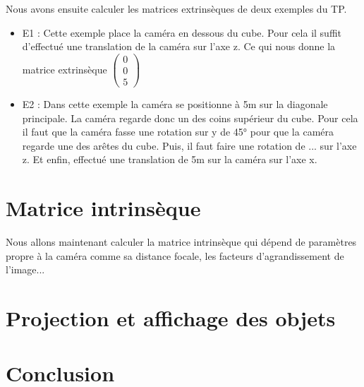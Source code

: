 \documentclass[a4paper,11pt]{article}
\begin{document}
  Nous avons ensuite calculer les matrices extrinsèques de deux exemples du TP.
  \begin{itemize}
   \item E1 : Cette exemple place la caméra en dessous du cube. Pour cela il suffit
   d'effectué une translation de la caméra sur l'axe z. Ce qui nous donne la matrice
   extrinsèque 
    $\begin{pmatrix}
      0\\
      0\\
      5
      \end{pmatrix}$
   \item E2 : Dans cette exemple la caméra se positionne à 5m sur la diagonale principale.
   La caméra regarde donc un des coins supérieur du cube. Pour cela il faut que la caméra 
   fasse une rotation sur y de 45° pour que la caméra regarde une des arêtes du cube. Puis,
   il faut faire une rotation de ...%
   sur l'axe z. Et enfin, effectué une translation de 5m sur la caméra sur l'axe x.
  \end{itemize}
  
  \section{Matrice intrinsèque}
  
  Nous allons maintenant calculer la matrice intrinsèque qui dépend de paramètres propre à la caméra comme
  sa distance focale, les facteurs d'agrandissement de l'image... 
  \section{Projection et affichage des objets}
  
  
  \section*{Conclusion}
  
    
\end{document}
